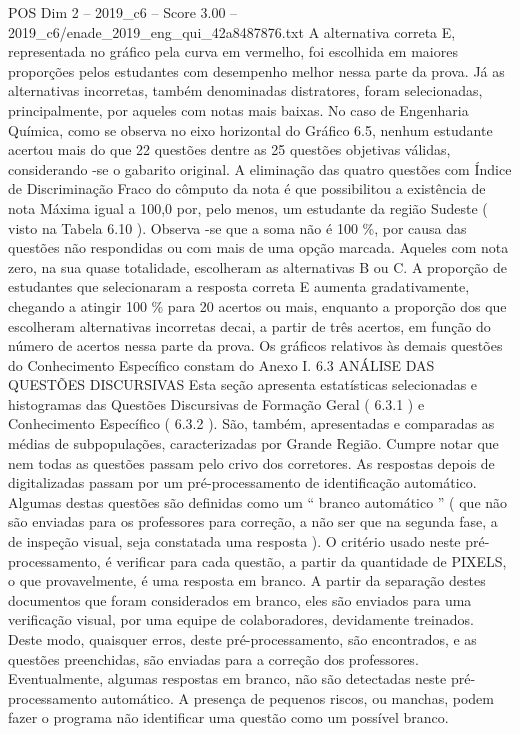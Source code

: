 \begin{textsample}{POS Dim 2 – 2019\_c6 – Score 3.00 – 2019\_c6/enade\_2019\_eng\_qui\_42a8487876.txt}
A alternativa correta E, representada no gráfico pela curva em vermelho, foi escolhida em maiores proporções pelos estudantes com desempenho melhor nessa parte da prova.
Já as alternativas incorretas, também denominadas distratores, foram selecionadas, principalmente, por aqueles com notas mais baixas.
No caso de Engenharia Química, como se observa no eixo horizontal do Gráfico 6.5, nenhum estudante acertou mais do que 22 questões dentre as 25 questões objetivas válidas, considerando -se o gabarito original.
A eliminação das quatro questões com Índice de Discriminação Fraco do cômputo da nota é que possibilitou a existência de nota Máxima igual a 100,0 por, pelo menos, um estudante da região Sudeste ( visto na Tabela 6.10 ).
Observa -se que a soma não é 100 \%, por causa das questões não respondidas ou com mais de uma opção marcada.
Aqueles com nota zero, na sua quase totalidade, escolheram as alternativas B ou C.
A proporção de estudantes que selecionaram a resposta correta E aumenta gradativamente, chegando a atingir 100 \% para 20 acertos ou mais, enquanto a proporção dos que escolheram alternativas incorretas decai, a partir de três acertos, em função do número de acertos nessa parte da prova.
Os gráficos relativos às demais questões do Conhecimento Específico constam do Anexo I. 6.3 ANÁLISE DAS QUESTÕES DISCURSIVAS Esta seção apresenta estatísticas selecionadas e histogramas das Questões Discursivas de Formação Geral ( 6.3.1 ) e Conhecimento Específico ( 6.3.2 ).
São, também, apresentadas e comparadas as médias de subpopulações, caracterizadas por Grande Região.
Cumpre notar que nem todas as questões passam pelo crivo dos corretores.
As respostas depois de digitalizadas passam por um pré-processamento de identificação automático.
Algumas destas questões são definidas como um “ branco automático ” ( que não são enviadas para os professores para correção, a não ser que na segunda fase, a de inspeção visual, seja constatada uma resposta ).
O critério usado neste pré-processamento, é verificar para cada questão, a partir da quantidade de PIXELS, o que provavelmente, é uma resposta em branco.
A partir da separação destes documentos que foram considerados em branco, eles são enviados para uma verificação visual, por uma equipe de colaboradores, devidamente treinados.
Deste modo, quaisquer erros, deste pré-processamento, são encontrados, e as questões preenchidas, são enviadas para a correção dos professores.
Eventualmente, algumas respostas em branco, não são detectadas neste pré-processamento automático.
A presença de pequenos riscos, ou manchas, podem fazer o programa não identificar uma questão como um possível branco.

\end{textsample}
